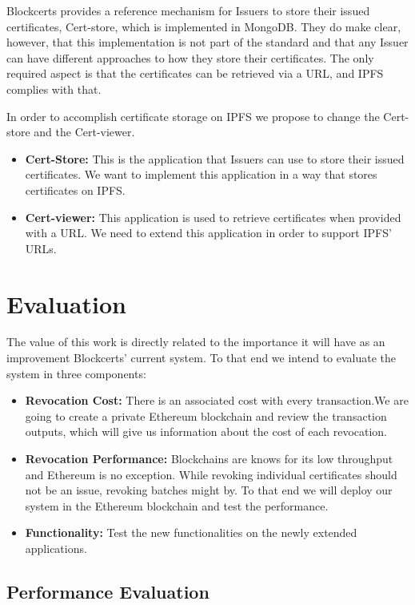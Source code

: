 \documentclass[llncsdoc]{llncs}
\begin{document}
Blockcerts provides a reference mechanism for Issuers to store their issued certificates, Cert-store, which is implemented in MongoDB. They do make clear, however, that this implementation is not part of the standard and that any Issuer can have different approaches to how they store their certificates. The only required aspect is that the certificates can be retrieved via a URL, and IPFS complies with that.

In order to accomplish certificate storage on IPFS we propose to change the Cert-store and the Cert-viewer.
\begin{itemize}
    \item \textbf{Cert-Store:} This is the application that Issuers can use to store their issued certificates. We want to implement this application in a way that stores certificates on IPFS.
    \item \textbf{Cert-viewer:} This application is used to retrieve certificates when provided with a URL. We need to extend this application in order to support IPFS' URLs.
\end{itemize}


\section{Evaluation}
\label{sec:evaluation}
The value of this work is directly related to the importance it will have as an improvement Blockcerts' current system. To that end we intend to evaluate the system in three components:

\begin{itemize}
    \item \textbf{Revocation Cost:} There is an associated cost with every transaction.We are going to create a private Ethereum blockchain and review the transaction outputs, which will give us information about the cost of each revocation.
    \item \textbf{Revocation Performance:} Blockchains are knows for its low throughput and Ethereum is no exception. While revoking individual certificates should not be an issue, revoking batches might by. To that end we will deploy our system in the Ethereum blockchain and test the performance.
    \item \textbf{Functionality:} Test the new functionalities on the newly extended applications.
\end{itemize}

\subsection{Performance Evaluation}
\end{document}
